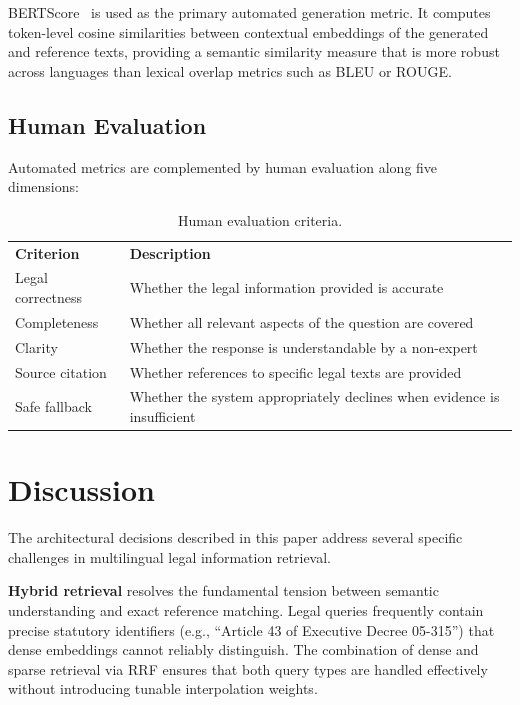 \documentclass[12pt, a4paper]{article}
\begin{document}
BERTScore~\cite{zhang2020bertscore} is used as the primary automated generation
metric. It computes token-level cosine similarities between contextual embeddings
of the generated and reference texts, providing a semantic similarity measure
that is more robust across languages than lexical overlap metrics such as BLEU
or ROUGE.

\subsection{Human Evaluation}

Automated metrics are complemented by human evaluation along five dimensions:

\begin{table}[H]
  \centering
  \caption{Human evaluation criteria.}
  \label{tab:human}
  \begin{tabularx}{\linewidth}{L{3.5cm} Y}
    \color{white}\textbf{Criterion} &
    \color{white}\textbf{Description} \\
    Legal correctness &
        Whether the legal information provided is accurate \\
    Completeness &
        Whether all relevant aspects of the question are covered \\
    Clarity &
        Whether the response is understandable by a non-expert \\
    Source citation &
        Whether references to specific legal texts are provided \\
    Safe fallback &
        Whether the system appropriately declines when evidence
        is insufficient \\
  \end{tabularx}
\end{table}

\section{Discussion}

The architectural decisions described in this paper address several specific
challenges in multilingual legal information retrieval.

\textbf{Hybrid retrieval} resolves the fundamental tension between semantic
understanding and exact reference matching. Legal queries frequently contain
precise statutory identifiers (e.g., ``Article 43 of Executive Decree 05-315'')
that dense embeddings cannot reliably distinguish. The combination of dense and
sparse retrieval via RRF ensures that both query types are handled effectively
without introducing tunable interpolation weights.
\end{document}
